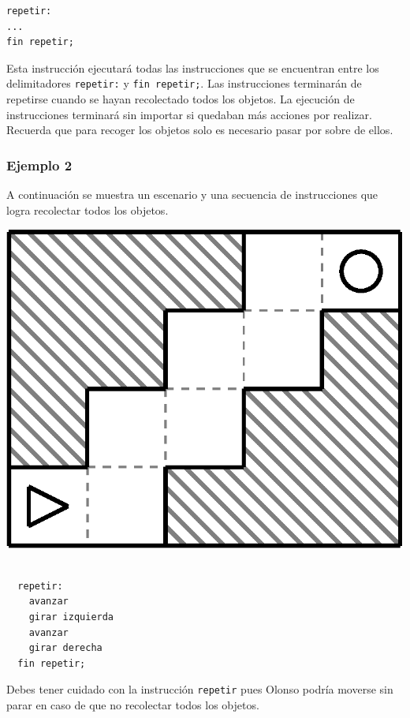 \documentclass{oci}
\def\bgcolor{\par\setbox0\vbox\bgroup}
\def\endbgcolor{\egroup\fboxsep0pt \noindent\colorbox[gray]{0.95}{\usebox0}\par}
\begin{document}
\begin{problemDescription}
\begin{verbatim}
repetir:
...
fin repetir;
\end{verbatim}

Esta instrucción ejecutará todas las instrucciones que se encuentran entre los delimitadores \texttt{repetir:} y \texttt{fin repetir;}.
Las instrucciones terminarán de repetirse cuando se hayan recolectado todos los objetos.
La ejecución de instrucciones terminará sin importar si quedaban más acciones por realizar.
Recuerda que para recoger los objetos solo es necesario pasar por sobre de ellos.

\subsubsection*{Ejemplo 2}
A continuación se muestra un escenario y una secuencia de instrucciones que logra recolectar todos los objetos.

\begin{minipage}{0.5\linewidth}
  \centering
  \includegraphics[scale=0.45]{laberintos/ejemplo2.eps}
\end{minipage}
\begin{minipage}{0.5\linewidth}
  \centering
 \bgcolor{}
\begin{verbatim}

  repetir:
    avanzar
    girar izquierda
    avanzar
    girar derecha
  fin repetir;
\end{verbatim}
 \endbgcolor{}
\end{minipage}

Debes tener cuidado con la instrucción \texttt{repetir} pues Olonso podría moverse sin parar en caso de que no recolectar todos los objetos.


\end{problemDescription}
\end{document}
